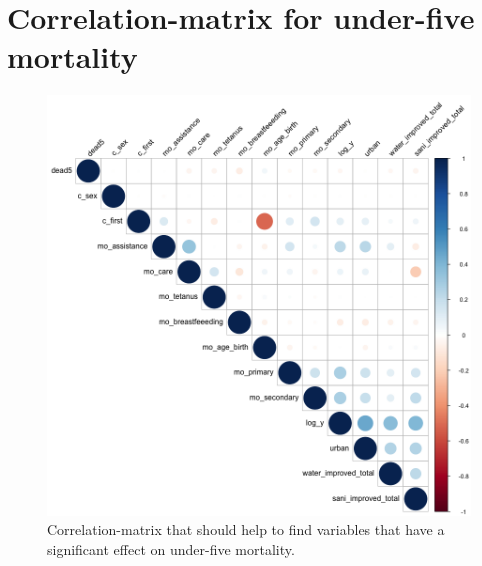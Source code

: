 \documentclass[a4paper, 11pt]{article} %
\begin{document}
\section{Correlation-matrix for under-five mortality} \label{sec:appendixd}
\begin{figure}[h!]
    \centering
    \includegraphics[scale=0.45]{figures/corrmatrix_dead5_4} 
    \caption{Correlation-matrix that should help to find variables that have a significant effect on under-five mortality.}
    \label{fig:corrmatrix_dead5}
\end{figure}

\end{document}
